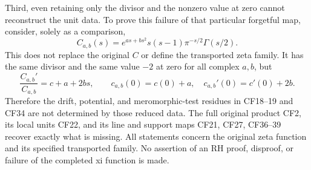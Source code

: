 Third, even retaining only the divisor and the
nonzero value at zero cannot reconstruct the unit
data. To prove this failure of that particular
forgetful map, consider, solely as a comparison,
\[
 C_{a,b}(s)=e^{as+bs^2}
             s(s-1)\pi^{-s/2}\Gamma(s/2).
 \tag{CF42}
\]
This does not replace the original \(C\) or define
the transported zeta family. It has the same divisor
and the same value \(-2\) at zero for all complex
\(a,b\), but
\[
 \frac{C_{a,b}'}{C_{a,b}}=c+a+2bs,\qquad
 c_{a,b}(0)=c(0)+a,\quad c_{a,b}'(0)=c'(0)+2b .
 \tag{CF43}
\]
Therefore the drift, potential, and meromorphic-test
residues in CF18--19 and CF34 are not determined by
those reduced data. The full original product CF2,
its local units CF22, and its line and support maps
CF21, CF27, CF36--39 recover exactly what is missing.
All statements concern the original zeta function
and its specified transported family. No assertion
of an RH proof, disproof, or failure of the completed
xi function is made.
